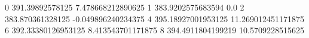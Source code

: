 0 391.39892578125 7.478668212890625
1 383.9202575683594 0.0
2 383.870361328125 -0.049896240234375
4 395.18927001953125 11.269012451171875
6 392.33380126953125 8.413543701171875
8 394.4911804199219 10.5709228515625
